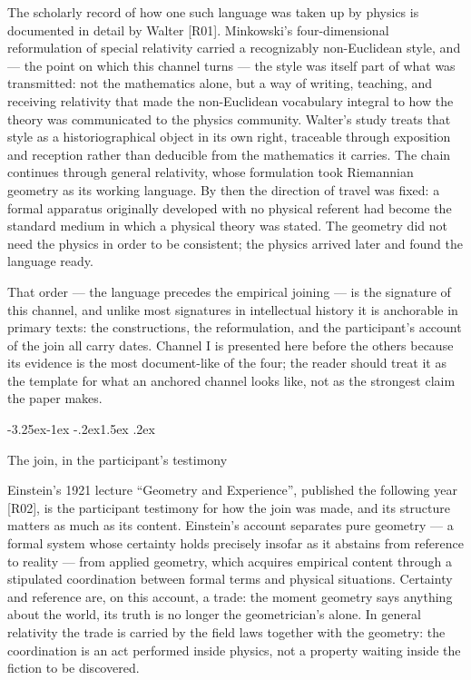 \documentclass[11pt,a4paper]{article}
\makeatletter
\renewcommand\subsection{\@startsection{subsection}{2}{\z@}%
  {-3.25ex\@plus -1ex \@minus -.2ex}{1.5ex \@plus .2ex}%
  {\normalfont\large\bfseries\raggedright}}
\makeatother
\begin{document}
The scholarly record of how one such language was taken up by physics is documented in detail by Walter [R01]. Minkowski's four-dimensional reformulation of special relativity carried a recognizably non-Euclidean style, and — the point on which this channel turns — the style was itself part of what was transmitted: not the mathematics alone, but a way of writing, teaching, and receiving relativity that made the non-Euclidean vocabulary integral to how the theory was communicated to the physics community. Walter's study treats that style as a historiographical object in its own right, traceable through exposition and reception rather than deducible from the mathematics it carries. The chain continues through general relativity, whose formulation took Riemannian geometry as its working language. By then the direction of travel was fixed: a formal apparatus originally developed with no physical referent had become the standard medium in which a physical theory was stated. The geometry did not need the physics in order to be consistent; the physics arrived later and found the language ready.

That order — the language precedes the empirical joining — is the signature of this channel, and unlike most signatures in intellectual history it is anchorable in primary texts: the constructions, the reformulation, and the participant's account of the join all carry dates. Channel I is presented here before the others because its evidence is the most document-like of the four; the reader should treat it as the template for what an anchored channel looks like, not as the strongest claim the paper makes.

\subsection{The join, in the participant's testimony}

Einstein's 1921 lecture ``Geometry and Experience'', published the following year [R02], is the participant testimony for how the join was made, and its structure matters as much as its content. Einstein's account separates pure geometry — a formal system whose certainty holds precisely insofar as it abstains from reference to reality — from applied geometry, which acquires empirical content through a stipulated coordination between formal terms and physical situations. Certainty and reference are, on this account, a trade: the moment geometry says anything about the world, its truth is no longer the geometrician's alone. In general relativity the trade is carried by the field laws together with the geometry: the coordination is an act performed inside physics, not a property waiting inside the fiction to be discovered.
\end{document}
